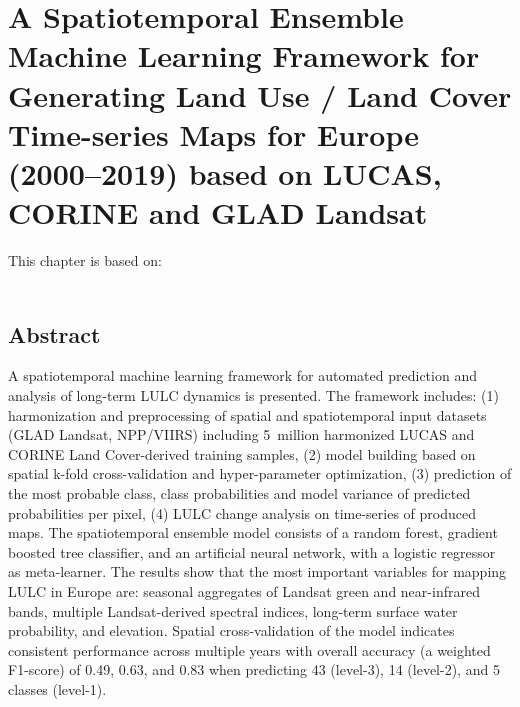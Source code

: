 \chapter[Spatiotemporal Machine Learning]{A Spatiotemporal Ensemble Machine Learning Framework for Generating Land Use / Land Cover Time-series Maps for Europe (2000--2019) based on LUCAS, CORINE and GLAD Landsat}
\label{cha:chapter3}
\vspace*{\fill}
This chapter is based on:
\\
\\
\newpage

\section*{Abstract}
A spatiotemporal machine learning framework for automated prediction and analysis of long-term LULC dynamics is presented. The framework includes: (1) harmonization and preprocessing of 
spatial and spatiotemporal input datasets (GLAD Landsat, NPP/VIIRS) including 5~million harmonized LUCAS and CORINE Land Cover-derived training samples, (2) model building based on spatial k-fold cross-validation and hyper-parameter optimization, (3) prediction of the most probable class, class probabilities and model variance of predicted probabilities per pixel, (4) LULC change analysis on time-series of produced maps. The spatiotemporal ensemble model consists of a random forest, gradient boosted tree classifier, and an artificial neural network, with a logistic regressor as meta-learner. The results show that the most important variables for mapping LULC in Europe are: seasonal aggregates of Landsat green and near-infrared bands, multiple Landsat-derived spectral indices, long-term surface water probability, and elevation. Spatial cross-validation of the model indicates consistent performance across multiple years with overall accuracy (a weighted F1-score) of 0.49, 0.63, and 0.83 when predicting 43 (level-3), 14 (level-2), and 5 classes (level-1). 
